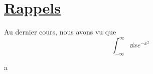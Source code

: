 


\section*{ \underline{Rappels}  }

Au dernier cours, nous avons vu que $$\int_{-\infty}^{\infty}\dd x e^{-x^2}$$ 


a



